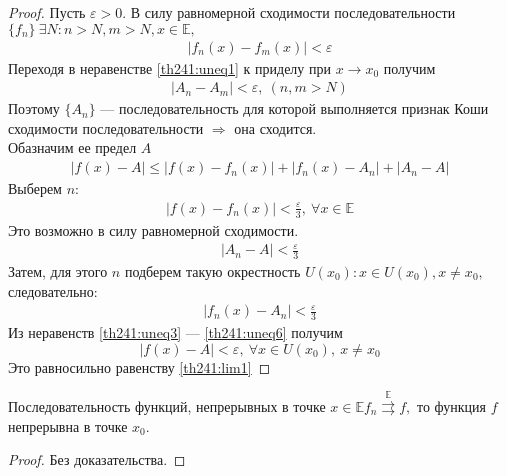\begin{proof}
  Пусть $\varepsilon > 0.$ В силу равномерной сходимости последовательности
  $\{f_n\} \ \exists N : n > N, m > N, x \in \mathbb{E},$
  \begin{gather}
    \left|f_n(x) - f_m(x)\right| < \varepsilon \label{th241:uneq1}
  \end{gather}
  Переходя в неравенстве \ref{th241:uneq1} к приделу при $x \to x_0$ получим
  \begin{gather}
    \left|A_n - A_m \right| < \varepsilon, \ (n, m > N) \label{th241:uneq2}
  \end{gather}
  Поэтому $\{A_n\}$ --- последовательность для которой выполняется признак
  Коши сходимости последовательности $\Rightarrow$ она сходится. \\
  Обазначим ее предел $A$ \\
  \begin{gather}
    \left|f(x) - A\right| \leq \left|f(x) - f_n(x)\right| +
    \left|f_n(x) - A_n\right| + \left|A_n - A\right| \label{th241:uneq3}
  \end{gather}
  Выберем $n:$
  \begin{gather}
    |f(x) - f_n(x)| < \frac{\varepsilon}{3}, \ \forall x \in \mathbb{E}
    \label{th241:uneq4}
  \end{gather}
  Это возможно в силу равномерной сходимости.
  \begin{gather}
    |A_n - A| < \frac{\varepsilon}{3} \label{th241:uneq5}
  \end{gather}
  Затем, для этого $n$ подберем такую окрестность
  $U(x_0): x \in U(x_0), x \not = x_0,$ следовательно:
  \begin{gather}
    |f_n(x) - A_n| < \frac{\varepsilon}{3} \label{th241:uneq6}
  \end{gather}
  Из неравенств \ref{th241:uneq3} --- \ref{th241:uneq6} получим
  $$|f(x) - A| < \varepsilon, \ \forall x \in U(x_0), \ x \not = x_0$$
  Это равносильно равенству \ref{th241:lim1}
\end{proof}

\begin{theorem}
  \label{th242}
  Последовательность функций, непрерывных в точке $x \in \mathbb{E}
  f_n \stackrel{\mathrm{\mathbb{E}}}{\rightrightarrows} f,$ то функция
  $f$ непрерывна в точке $x_0$.
\end{theorem}

\begin{proof}
  Без доказательства.
\end{proof}


